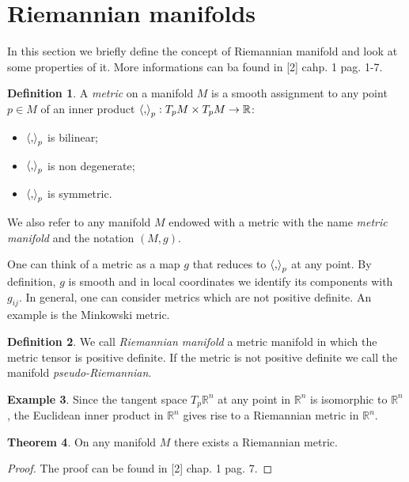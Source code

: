 \documentclass[12pt,a4paper]{report}
\theoremstyle{definition}
\newtheorem{Def}{Definition}[chapter]
\theoremstyle{Theorem}
\newtheorem{Theo}[Def]{Theorem}
\theoremstyle{definition}
\newtheorem{Ex}[Def]{Example}
\theoremstyle{definition}
\begin{document}
	\section{Riemannian manifolds}
	In this section we briefly define the concept of Riemannian manifold and look at some properties of it. More informations can ba found in [2] cahp. 1 pag. 1-7.
	\begin{Def}
		A \textit{metric} on a manifold $M$ is a smooth assignment to any point $p\in M$ of an inner product $\braket{,}_p:T_pM\times T_pM\rightarrow \mathbb{R}$:
		\begin{itemize}
			\item $\braket{,}_p$ is bilinear;
			\item $\braket{,}_p$ is non degenerate;
			\item $\braket{,}_p$ is symmetric.
		\end{itemize}
		We also refer to any manifold $M$ endowed with a metric with the name \textit{metric manifold} and the notation $(M,g)$.
	\end{Def}
	One can think of a metric as a map $g$ that reduces to $\braket{,}_p$ at any point. By definition, $g$ is smooth and in local coordinates we identify its components with $g_{ij}$.
	In general, one can consider metrics which are not positive definite. An example is the Minkowski metric.
	\begin{Def}
		We call \textit{Riemannian manifold} a metric manifold in which the metric tensor is positive definite. If the metric is not positive definite we call the manifold \textit{pseudo-Riemannian}.
	\end{Def}
	\begin{Ex}
		Since the tangent space $T_p\mathbb{R}^n$ at any point in $\mathbb{R}^n$ is isomorphic to $\mathbb{R}^n$, the Euclidean inner product in $\mathbb{R}^n$ gives rise to a Riemannian metric in $\mathbb{R}^n$.		
	\end{Ex}
	\begin{Theo}
		On any manifold $M$ there exists a Riemannian metric.
	\end{Theo}
	\begin{proof}
		The proof can be found in [2] chap. 1 pag. 7.
	\end{proof}
\end{document}

